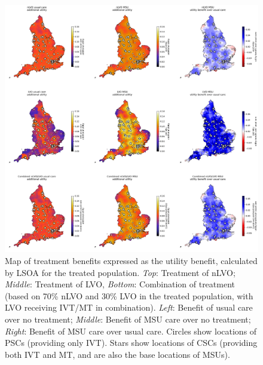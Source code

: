 \begin{figure}[h!]
    \centering
    \includegraphics[width=1\linewidth]{images/map_utility.jpg}
    \caption{Map of treatment benefits expressed as the  utility benefit, calculated by LSOA for the treated population. \textit{Top}: Treatment of nLVO; \textit{Middle}: Treatment of LVO, \textit{Bottom}: Combination of treatment (based on 70\% nLVO and 30\% LVO in the treated population, with LVO receiving IVT/MT in combination). \textit{Left}: Benefit of usual care over no treatment; \textit{Middle}: Benefit of MSU care over no treatment; \textit{Right}: Benefit of MSU care over usual care. Circles show locations of PSCs (providing only IVT). Stars show locations of CSCs (providing both IVT and MT, and are also the base locations of MSUs).}
    \label{fig:msu_map_utility}
\end{figure}

